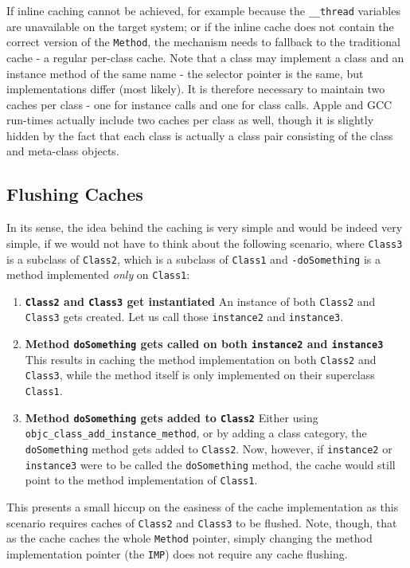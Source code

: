 If inline caching cannot be achieved, for example because the \verb=__thread= variables are unavailable on the target system; or if the inline cache does not contain the correct version of the \verb=Method=, the mechanism needs to fallback to the traditional cache - a regular per-class cache. Note that a class may implement a class and an instance method of the same name - the selector pointer is the same, but implementations differ (most likely). It is therefore necessary to maintain two caches per class - one for instance calls and one for class calls. Apple and GCC run-times actually include two caches per class as well, though it is slightly hidden by the fact that each class is actually a class pair consisting of the class and meta-class objects.

\subsection{Flushing Caches}

In its sense, the idea behind the caching is very simple and would be indeed very simple, if we would not have to think about the following scenario, where \verb=Class3= is a subclass of \verb=Class2=, which is a subclass of \verb=Class1= and \verb=-doSomething= is a method implemented \emph{only} on \verb=Class1=:

\begin{enumerate}
  \item{\bf{\verb=Class2= and \verb=Class3= get instantiated}} An instance of both \verb=Class2= and \verb=Class3= gets created. Let us call those \verb=instance2= and \verb=instance3=.
  \item{\bf{Method \verb=doSomething= gets called on both \verb=instance2= and \verb=instance3=}} This results in caching the method implementation on both \verb=Class2= and \verb=Class3=, while the method itself is only implemented on their superclass \verb=Class1=.
  \item{\bf{Method \verb=doSomething= gets added to \verb=Class2=}} Either using \newline{}\verb=objc_class_add_instance_method=, or by adding a class category, the \verb=doSomething= method gets added to \verb=Class2=. Now, however, if \verb=instance2= or \verb=instance3= were to be called the \verb=doSomething= method, the cache would still point to the method implementation of \verb=Class1=.
\end{enumerate}

This presents a small hiccup on the easiness of the cache implementation as this scenario requires caches of \verb=Class2= and \verb=Class3= to be flushed. Note, though, that as the cache caches the whole \verb=Method= pointer, simply changing the method implementation pointer (the \verb=IMP=) does not require any cache flushing.

